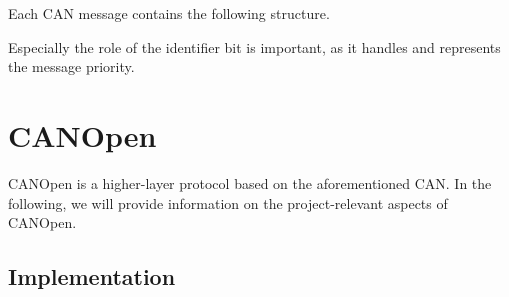 Each CAN message contains the following structure.

Especially the role of the identifier bit is important, as it handles and represents the message priority.

\section{CANOpen}

CANOpen is a higher-layer protocol based on the aforementioned CAN. In the following, we will provide information on the project-relevant aspects of CANOpen.




\subsection{Implementation}

